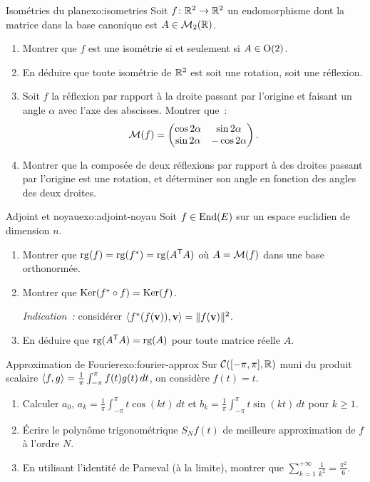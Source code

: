 \begin{exercise}{\challenging{} Isométries du plan}{exo:isometries}
  Soit $f\colon{\mathbb{R}}^2\to{\mathbb{R}}^2$ un endomorphisme dont la matrice dans la base
  canonique est $A\in\mathcal{M}_2({\mathbb{R}})$.
  \begin{enumerate}[label=(\alph*)]
    \item Montrer que $f$ est une isométrie si et seulement si
      $A\in\operatorname{O}(2)$.
    \item En déduire que toute isométrie de ${\mathbb{R}}^2$ est soit une rotation,
      soit une réflexion.
    \item Soit $f$ la réflexion par rapport à la droite passant par
      l'origine et faisant un angle $\alpha$ avec l'axe des abscisses.
      Montrer que~:
      \[
        \mathcal{M}(f)=\begin{pmatrix}\cos 2\alpha&\sin 2\alpha\\
        \sin 2\alpha&-\cos 2\alpha\end{pmatrix}.
      \]
    \item Montrer que la composée de deux réflexions par rapport à des
      droites passant par l'origine est une rotation, et déterminer son
      angle en fonction des angles des deux droites.
  \end{enumerate}
\end{exercise}

\begin{exercise}{\challenging{} Adjoint et noyau}{exo:adjoint-noyau}
  Soit $f\in\operatorname{End}(E)$ sur un espace euclidien de dimension $n$.
  \begin{enumerate}[label=(\alph*)]
    \item Montrer que $\operatorname{rg}(f)=\operatorname{rg}(f^*)=\operatorname{rg}({A}^{\mathsf{T}}A)$ où
      $A=\mathcal{M}(f)$ dans une base orthonormée.
    \item Montrer que $\operatorname{Ker}(f^*\circ f)=\operatorname{Ker}(f)$.

      \emph{Indication~:} considérer
      $\langle f^*(f(\mathbf{v})),\mathbf{v}\rangle=\lVert f(\mathbf{v})\rVert^2$.
    \item En déduire que $\operatorname{rg}({A}^{\mathsf{T}}A)=\operatorname{rg}(A)$ pour toute
      matrice réelle $A$.
  \end{enumerate}
\end{exercise}

\begin{exercise}{\challenging{} Approximation de Fourier}{exo:fourier-approx}
  Sur $\mathcal{C}([-\pi,\pi],{\mathbb{R}})$ muni du produit scalaire
  $\langle f,g\rangle=\frac{1}{\pi}\int_{-\pi}^{\pi}f(t)g(t)\,dt$, on
  considère $f(t)=t$.
  \begin{enumerate}[label=(\alph*)]
    \item Calculer $a_0$, $a_k=\frac{1}{\pi}\int_{-\pi}^{\pi}
      t\cos(kt)\,dt$ et $b_k=\frac{1}{\pi}\int_{-\pi}^{\pi}
      t\sin(kt)\,dt$ pour $k\geq 1$.
    \item Écrire le polynôme trigonométrique $S_N f(t)$ de meilleure
      approximation de $f$ à l'ordre $N$.
    \item En utilisant l'identité de Parseval (à la limite),
      montrer que $\sum_{k=1}^{+\infty}\frac{1}{k^2}
      =\frac{\pi^2}{6}$.
  \end{enumerate}
\end{exercise}

